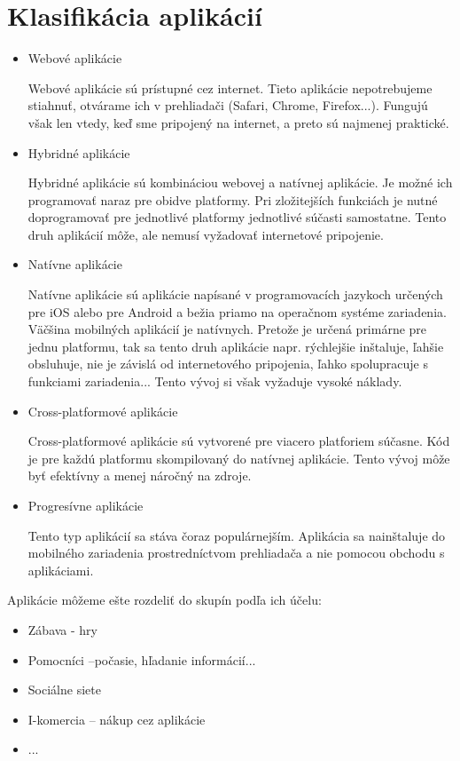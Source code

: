 \documentclass[10pt,twoside,slovak,a4paper]{article}
\begin{document}
\section{Klasifikácia aplikácií}
\begin{itemize}
\item  Webové aplikácie

Webové aplikácie sú prístupné cez internet. Tieto aplikácie nepotrebujeme stiahnuť, otvárame ich v prehliadači (Safari, Chrome, Firefox...). Fungujú však len vtedy, keď sme pripojený na internet, a preto sú najmenej praktické.

\item Hybridné aplikácie

Hybridné aplikácie sú kombináciou webovej a natívnej aplikácie. Je možné ich programovať naraz pre obidve platformy. Pri zložitejších funkciách je nutné doprogramovať pre jednotlivé platformy jednotlivé súčasti samostatne. Tento druh aplikácií môže, ale nemusí vyžadovať internetové pripojenie.

\item Natívne aplikácie

Natívne aplikácie sú aplikácie napísané v programovacích jazykoch určených pre iOS alebo pre Android a bežia priamo na operačnom systéme zariadenia. Väčšina mobilných aplikácií je natívnych. Pretože je určená primárne pre jednu platformu, tak sa tento druh aplikácie napr. rýchlejšie inštaluje, ľahšie obsluhuje, nie je závislá od internetového pripojenia, ľahko spolupracuje s funkciami zariadenia... Tento vývoj si však vyžaduje vysoké náklady.

\item Cross-platformové aplikácie

Cross-platformové aplikácie sú vytvorené pre viacero platforiem súčasne. Kód je pre každú platformu skompilovaný do natívnej aplikácie. Tento vývoj môže byť efektívny a menej náročný na zdroje.

\item Progresívne aplikácie

Tento typ aplikácií sa stáva čoraz populárnejším. Aplikácia sa nainštaluje do mobilného zariadenia prostredníctvom prehliadača a nie pomocou obchodu s aplikáciami.
\end{itemize}

Aplikácie môžeme ešte rozdeliť do skupín podľa ich účelu:
\begin{itemize}
\item Zábava - hry
\item Pomocníci –počasie, hľadanie informácií...
\item Sociálne siete
\item I-komercia – nákup cez aplikácie
\item ...
\end{itemize}
\end{document}
